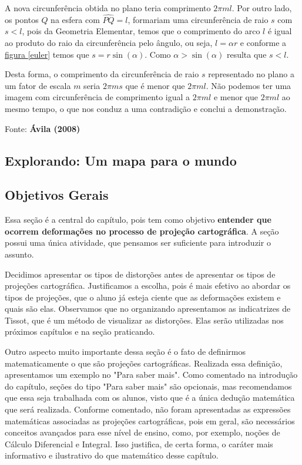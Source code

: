 A nova circunferência obtida no plano teria comprimento $2\pi 𝑚l$. Por outro lado, os pontos $Q$ na esfera com $ \widehat{PQ} = l$, formariam uma circunferência de raio $s$ com $s < l$, pois da Geometria Elementar, temos que o comprimento do arco $l$ é igual ao produto do raio da circunferência pelo ângulo, ou seja, $l = \alpha r$ e conforme a \hyperref[euler]{figura \ref{euler}} temos que $s =r \sin (\alpha)$. Como $\alpha > \sin(\alpha)$ resulta que $s < l$.

Desta forma, o comprimento da circunferência de raio $s$ representado no plano a um fator de escala $m$ seria $2\pi 𝑚𝑠$ que é menor que $2\pi 𝑚l$. Não podemos ter uma imagem com circunferência de comprimento igual a $2\pi 𝑚l$ e menor que $2\pi 𝑚l$ ao mesmo tempo, o que nos conduz a uma contradição e conclui a demonstração.

Fonte: \textbf{Ávila (2008)}

\cleardoublepage

\def\currentcolor{session1}
\begin{texto}
{
\section{Explorando: Um mapa para o mundo}

\subsection{Objetivos Gerais}

Essa seção é a central do capítulo, pois tem como objetivo \textbf{entender que ocorrem deformações no processo de projeção cartográfica}. A seção possui uma única atividade, que pensamos ser suficiente para introduzir o assunto. 

Decidimos apresentar os tipos de distorções antes de apresentar os tipos de  projeções cartográfica. Justificamos a escolha, pois é mais efetivo ao abordar os tipos de projeções, que o aluno já esteja ciente que as deformações existem e quais são elas. Observamos que no organizando apresentamos as indicatrizes de Tissot, que é um método de visualizar as distorções. Elas serão utilizadas nos próximos capítulos e na seção praticando.

Outro aspecto muito importante dessa seção é o fato de definirmos matematicamente o que são projeções cartográficas. Realizada essa definição, apresentamos um exemplo no "Para saber mais". Como comentado na introdução do capítulo, seções do tipo "Para saber mais"{} são opcionais, mas recomendamos que essa seja trabalhada com os alunos, visto que é a única dedução matemática que será realizada. Conforme comentado, não foram apresentadas as expressões matemáticas associadas as projeções cartográficas, pois em geral, são necessários conceitos avançados para esse nível de ensino, como, por exemplo, noções de Cálculo Diferencial e Integral. Isso justifica, de certa forma, o caráter mais informativo e ilustrativo do que matemático desse capítulo.
}
\end{texto}

